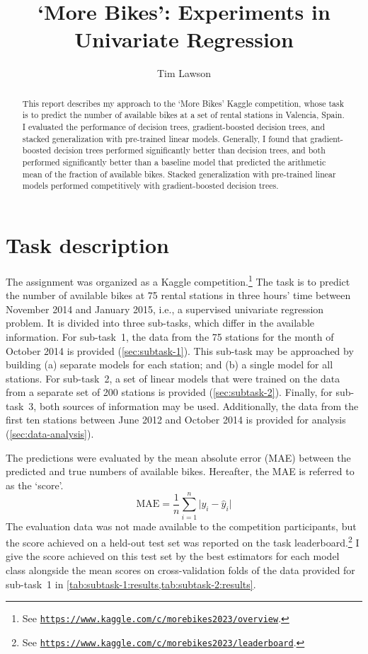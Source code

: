 \documentclass[11pt]{extarticle}
\newcommand{\kaggle}[1]{\href{https://www.kaggle.com/c/morebikes2023/#1}{\lstinline|https://www.kaggle.com/c/morebikes2023/#1|}}
\begin{document}
\title{`More Bikes': Experiments in Univariate Regression}
\author[]{Tim Lawson}
\date{}

\maketitle

\begin{abstract}
  This report describes my approach to the `More Bikes' Kaggle competition, whose task is
  to predict the number of available bikes at a set of rental stations in Valencia,
  Spain.
  I evaluated the performance of decision trees, gradient-boosted decision trees, and
  stacked generalization with pre-trained linear models.
  Generally, I found that gradient-boosted decision trees performed significantly better
  than decision trees, and both performed significantly better than a baseline model that
  predicted the arithmetic mean of the fraction of available bikes.
  Stacked generalization with pre-trained linear models performed competitively with
  gradient-boosted decision trees.
\end{abstract}

\section{Task description}
\label{sec:task-description}

The assignment was organized as a Kaggle competition.\footnote{See \kaggle{overview}.
}
The task is to predict the number of available bikes at 75 rental stations in three
hours' time between November 2014 and January 2015, i.e., a supervised univariate
regression problem.
It is divided into three sub-tasks, which differ in the available information.
For sub-task~1, the data from the 75 stations for the month of October 2014 is provided
(\cref{sec:subtask-1}).
This sub-task may be approached by building (a) separate models for each station; and
(b) a single model for all stations.
For sub-task~2, a set of linear models that were trained on the data from a separate
set of 200 stations is provided (\cref{sec:subtask-2}).
Finally, for sub-task~3, both sources of information may be used.
Additionally, the data from the first ten stations between June 2012 and October 2014
is provided for analysis (\cref{sec:data-analysis}).

The predictions were evaluated by the mean absolute error (MAE) between the predicted
and true numbers of available bikes.
Hereafter, the MAE is referred to as the `score'.
\begin{equation}
  \label{eq:mae}
  \text{MAE} = \frac{1}{n} \sum_{i = 1}^n \lvert y_i - \hat{y}_i \rvert
\end{equation}
The evaluation data was not made available to the competition participants, but the
score achieved on a held-out test set was reported on the task
leaderboard.\footnote{See \kaggle{leaderboard}.
}
I give the score achieved on this test set by the best estimators for each model class
alongside the mean scores on cross-validation folds of the data provided for sub-task~1
in \cref{tab:subtask-1:results,tab:subtask-2:results}.
\end{document}
